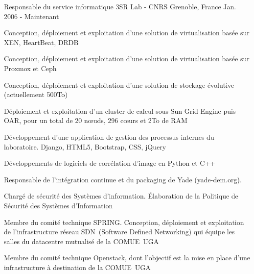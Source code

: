 

\begin{cventries}

  \cventry
    {Responsable du service informatique} %
    {3SR Lab - CNRS} %
    {Grenoble, France} %
    {Jan. 2006 - Maintenant} %
    {
      \begin{cvitems} %
        \item {Conception, déploiement et exploitation d'une solution de virtualisation basée sur XEN, HeartBeat, DRDB}
        \item {Conception, déploiement et exploitation d'une solution de virtualisation basée sur Proxmox et Ceph}
	\item {Conception, déploiement et exploitation d'une solution de stockage évolutive (actuellement 500To)}
        \item {Déploiement et exploitation d'un cluster de calcul sous Sun Grid Engine puis OAR, pour un total de 20 nœuds, 296 cœurs et 2To de RAM}
        \item {Développement d'une application de gestion des processus internes du laboratoire. Django, HTML5, Bootstrap, CSS, jQuery}
        \item {Développements de logiciels de corrélation d'image en Python et C++}
        \item {Responsable de l'intégration continue et du packaging de Yade (yade-dem.org).}
        \item {Chargé de sécurité des Systèmes d'information. Élaboration de la Politique de Sécurité des Systèmes d'Information}
	\item {Membre du comité technique SPRING. Conception, déploiement et exploitation de l'infrastructure réseau SDN (Software Defined Networking) qui équipe les salles du datacentre mutualisé de la COMUE UGA}
        \item {Membre du comité technique Openstack, dont l'objectif est la mise en place d'une infrastructure à destination de la COMUE UGA}
      \end{cvitems}
    }


\end{cventries}
